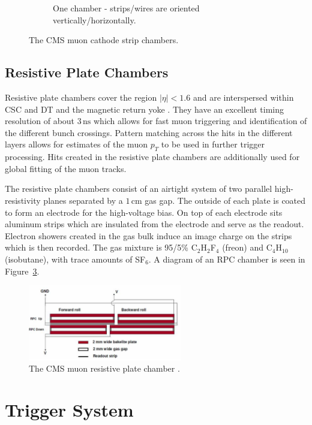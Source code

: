 \begin{figure}[hbp!]
\begin{subfigure}[c]{0.3\textwidth}
\caption{One chamber - strips/wires are oriented vertically/horizontally.}
\label{fig:cscchamber}
\end{subfigure}
\caption{The CMS muon cathode strip chambers.}
\end{figure}

\subsection{Resistive Plate Chambers}

Resistive plate chambers cover the region $|\eta| < 1.6$ and are interspersed within CSC and DT and the magnetic return yoke \cite{rpc}. They have an excellent timing resolution of about $3\,\textrm{ns}$ which allows for fast muon triggering and identification of the different bunch crossings. Pattern matching across the hits in the different layers allows for estimates of the muon $p_{T}$ to be used in further trigger processing. Hits created in the resistive plate chambers are additionally used for global fitting of the muon tracks.

The resistive plate chambers consist of an airtight system of two parallel high-resistivity planes separated by a $1\,\textrm{cm}$ gas gap. The outside of each plate is coated to form an electrode for the high-voltage bias. On top of each electrode sits aluminum strips which are insulated from the electrode and serve as the readout. Electron showers created in the gas bulk induce an image charge on the strips which is then recorded. The gas mixture is 95/5\% C$_{2}$H$_{2}$F$_{4}$ (freon) and C$_{4}$H$_{10}$ (isobutane), with trace amounts of SF$_{6}$. A diagram of an RPC chamber is seen in Figure~\ref{fig:rpc}.

\begin{figure}[hbp!]
\centering
\includegraphics[width=0.6\textwidth]{figs/rpc.png}
\caption[The CMS muon resistive plate chamber.]{The CMS muon resistive plate chamber \cite{rpc}.}
\label{fig:rpc}
\end{figure}

\section{Trigger System}

